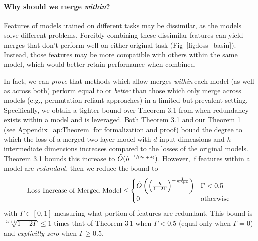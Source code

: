 \paragraph{Why should we merge \textit{within}?} %
Features of models trained on different tasks may be dissimilar, as the models solve different problems. 
Forcibly combining these dissimilar features can yield merges that don't perform well on either original task (Fig~\ref{fig:loss_basin}).
Instead, those features may be more compatible with others within the same model, which would better retain performance when combined. %

In fact, we can \textit{prove} that methods which allow merges \textit{within} each model (as well as across both) perform equal to or \textit{better} than those which only merge across models (e.g., permutation-reliant approaches) in a limited but prevalent setting.
Specifically, we obtain a tighter bound over Theorem 3.1 from \citet{entezari2021role} when redundancy exists within a model and is leveraged. 
Both Theorem 3.1 and our Theorem \hyperref[ap:TheoremDef]{1} (see Appendix~\ref{ap:Theorem} for formalization and proof) bound the degree to which the loss of a merged two-layer model with $d$-input dimensions and $h$-intermediate dimensions increases compared to the losses of the original models. 
Theorem 3.1 bounds this increase to $\Tilde{O}(h^{-\sfrac{1}{(2d+4)}})$.
However, if features within a model are \textit{redundant}, then we reduce the bound to%
\begin{equation} \label{eq:mainpaper_barrier}
    \text{Loss Increase of Merged Model} \leq
        \begin{cases}
            \Tilde{O}\left(\left(\frac{h}{1-2\Gamma}\right)^{-\frac{1}{2d+4}}  \right) & \Gamma < 0.5 \\
            0 &\text{otherwise}
        \end{cases}
\end{equation}
with $\Gamma\in[0,1]$ measuring what portion of features are redundant. 
This bound is %
$\sqrt[2d+4]{1-2\Gamma} \leq 1$
times that of Theorem 3.1 when $\Gamma < 0.5$ (equal only when $\Gamma = 0$) and \textit{explicitly zero} when $\Gamma \geq 0.5$.

